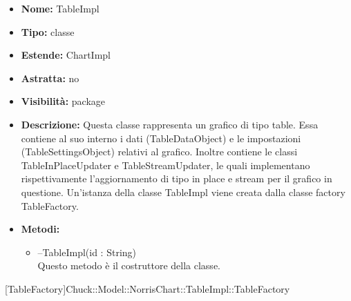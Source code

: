 	
			
			\begin{itemize}
			\item \textbf{Nome:} TableImpl
			\item \textbf{Tipo:} classe
			
		\item \textbf{Estende:}
		ChartImpl
		\item \textbf{Astratta:}
		no
			\item \textbf{Visibilità:} package
			\item \textbf{Descrizione:} Questa classe rappresenta un grafico di tipo table. Essa contiene al suo interno i dati (TableDataObject) e le impostazioni (TableSettingsObject) relativi al grafico. Inoltre contiene le classi TableInPlaceUpdater e TableStreamUpdater, le quali implementano rispettivamente l'aggiornamento di tipo in place e stream per il grafico in questione. Un'istanza della classe TableImpl viene creata dalla classe factory TableFactory.
			\item \textbf{Metodi:}
				\begin{itemize}
				\setlength{\itemsep}{5pt}
				
					\item[\ding{111}] {{--TableImpl(id : String)}} \\ [1mm] Questo metodo è il costruttore della classe.
				\end{itemize}
		
			\end{itemize}

			
			[TableFactory]{Chuck::Model::NorrisChart::TableImpl::TableFactory}
			


